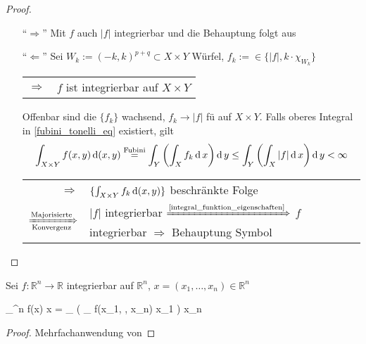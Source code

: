 \begin{proof}\hspace*{0pt}
	\NoEndMark
	\begin{itemize}
		\item["`$\Rightarrow$"'] Mit $f$ auch $\vert f \vert$ integrierbar und die Behauptung folgt aus 
		
		\item["`$\Leftarrow$"'] Sei $W_k := (-k,k)^{p+q}\subset X\times Y$ Würfel, $f_k := \in \{ \vert f \vert, k\cdot \chi_{W_k} \}$ \\
		\begin{tabularx}{\linewidth}{r@{\ \ }X}
		$\Rightarrow$ & $f$ ist integrierbar auf $X\times Y$
		\end{tabularx}
		
		Offenbar sind die $\{ f_k \}$ wachsend, $f_k\to \vert f \vert$ \gls{fü} auf $X\times Y$. Falls oberes Integral in \eqref{fubini_tonelli_eq} existiert, gilt \begin{align*}
			\int_{X\times Y} f(x,y) \operatorname{d}(x,y) \overset{\text{Fubini}}{=} \int_Y \left( \int_X f_k \operatorname{d} x\right) \operatorname{d} y \le \int_Y \left( \int_X \vert f \vert \operatorname{d} x \right)\operatorname{d} y < \infty
		\end{align*}
		\begin{tabularx}{\linewidth}{r@{\ \ }X}
		$\Rightarrow$ & $\{\int_{X\times Y} f_k \operatorname{d} (x,y)\}$ beschränkte Folge \\
		$\xRightarrow[\text{Konvergenz}]{\text{Majorisierte}}$ & $\vert f \vert$ integrierbar $\xRightarrow{\text{\cref{integral_funktion_eigenschaften}}}$ $f$ integrierbar $\Rightarrow$ Behauptung \hfill\csname\InTheoType Symbol\endcsname
	\end{tabularx}
	\end{itemize}
\end{proof}

\begin{conclusion}
	Sei $f:\mathbb{R}^n\to\mathbb{R}$ integrierbar auf $\mathbb{R}^n$, $x = (x_1, \dotsc, x_n)\in\mathbb{R}^n$ \\
	\begin{flalign}
		\Rightarrow\;\;\int_{^n} f(x) \D x = \int_ \dotsc \left( \int_ f(x_1, \dotsc, x_n) \D x_1 \right) \dotsc \D x_n
	\end{flalign}
\end{conclusion}
\begin{proof}
	Mehrfachanwendung von 
\end{proof}

